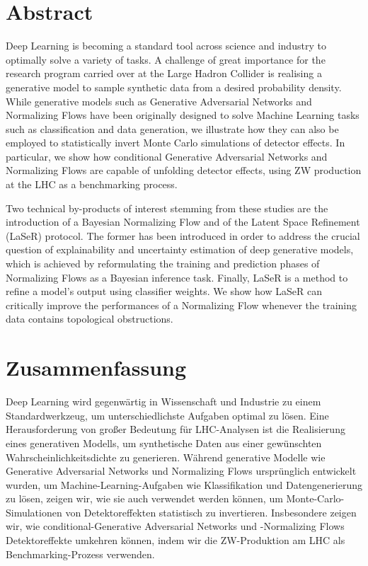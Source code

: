 %
%
\thispagestyle{empty}
%
\vspace*{1cm}
\section*{Abstract}

Deep Learning is becoming a standard tool across science and industry to optimally solve a variety of tasks.
A challenge of great importance for the research program carried over at the Large Hadron Collider is realising a generative model to sample synthetic data from a desired probability density.
While generative models such as Generative Adversarial Networks and Normalizing Flows have been originally designed to solve Machine Learning tasks such as classification and data generation, we illustrate how they can also be employed to statistically invert Monte Carlo simulations of detector effects. 
In particular, we show how conditional Generative Adversarial Networks and Normalizing Flows are capable of unfolding detector effects, using ZW production at the LHC as a benchmarking process.

Two technical by-products of interest stemming from these studies are the introduction of a Bayesian Normalizing Flow and of the Latent Space Refinement (LaSeR) protocol. The former has been introduced in order to address the crucial question of explainability and uncertainty estimation of deep generative models, which is achieved by reformulating the training and prediction phases of Normalizing Flows as a Bayesian inference task. Finally, LaSeR is a method to refine a model's output using classifier weights. We show how LaSeR can critically improve the performances of a Normalizing Flow whenever the training data contains topological obstructions.

\vspace*{2.2cm}
\section*{Zusammenfassung}

Deep Learning wird gegenwärtig in Wissenschaft und Industrie zu einem Standardwerkzeug, um unterschiedlichste Aufgaben optimal zu lösen.
Eine Herausforderung von großer Bedeutung für LHC-Analysen ist die Realisierung eines generativen Modells, um synthetische Daten aus einer gewünschten Wahrscheinlichkeitsdichte zu generieren. Während generative Modelle wie Generative Adversarial Networks und Normalizing Flows ursprünglich entwickelt wurden, um Machine-Learning-Aufgaben wie Klassifikation und Datengenerierung zu lösen, zeigen wir, wie sie auch verwendet werden können, um Monte-Carlo-Simulationen von Detektoreffekten statistisch zu invertieren.
Insbesondere zeigen wir, wie conditional-Generative Adversarial Networks und -Normalizing Flows Detektoreffekte umkehren können, indem wir die ZW-Produktion am LHC als Benchmarking-Prozess verwenden.

